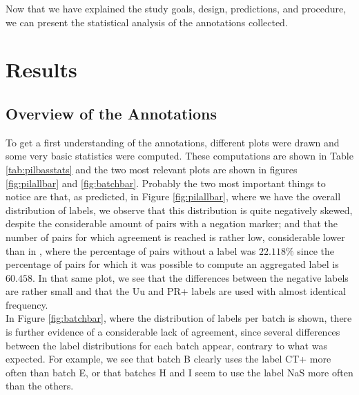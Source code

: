 Now that we have explained the study goals, design, predictions, and procedure, we can present the statistical analysis of the annotations collected.\\

\section{Results}
\subsection{Overview of the Annotations}
\label{subsect:piloverview}
To get a first understanding of the annotations, different plots were drawn and some very basic statistics were computed. These computations are shown in Table \ref{tab:pilbasstats} and the two most relevant plots are shown in figures \ref{fig:pilallbar} and \ref{fig:batchbar}. Probably the two most important things to notice are that, as predicted, in Figure \ref{fig:pilallbar}, where we have the overall distribution of labels, we observe that this distribution is quite negatively skewed, despite the considerable amount of pairs with a negation marker; and that the number of pairs for which agreement is reached is rather low, considerable lower than in \citet{de2012did}, where the percentage of pairs without a label was $22.118\%$ since the percentage of pairs for which it was possible to compute an aggregated label is $60.458$. In that same plot, we see that the differences between the negative labels are rather small and that the Uu and PR+ labels are used with almost identical frequency.\\ 

In Figure \ref{fig:batchbar}, where the distribution of labels per batch is shown, there is further evidence of a considerable lack of agreement, since several differences between the label distributions for each batch appear, contrary to what was expected. For example, we see that batch B clearly uses the label CT+ more often than batch E, or that batches H and I seem to use the label NaS more often than the others.\\

